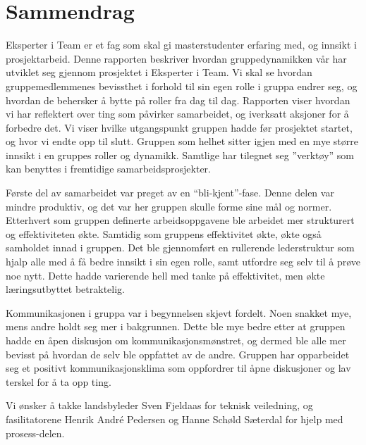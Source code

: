 \chapter*{Sammendrag}
Eksperter i Team er et fag som skal gi masterstudenter erfaring med, og innsikt i prosjektarbeid.
Denne rapporten beskriver hvordan gruppedynamikken vår har utviklet seg gjennom prosjektet i Eksperter i Team.
Vi skal se hvordan gruppemedlemmenes bevissthet i forhold til sin egen rolle i gruppa endrer seg, og hvordan de behersker å bytte på roller fra dag til dag.
Rapporten viser hvordan vi har reflektert over ting som påvirker samarbeidet, og iverksatt aksjoner for å forbedre det. 
Vi viser hvilke utgangspunkt gruppen hadde før prosjektet startet, og hvor vi endte opp til slutt. 
Gruppen som helhet sitter igjen med en mye større innsikt i en gruppes roller og dynamikk. 
Samtlige har tilegnet seg ''verktøy'' som kan benyttes i fremtidige samarbeidsprosjekter.
\vspace{\secspace}

Første del av samarbeidet var preget av en ``bli-kjent''-fase.
Denne delen var mindre produktiv, og det var her gruppen skulle forme sine mål og normer. 
Etterhvert som gruppen definerte arbeidsoppgavene ble arbeidet mer strukturert og effektiviteten økte. 
Samtidig som gruppens effektivitet økte, økte også samholdet innad i gruppen. 
Det ble gjennomført en rullerende lederstruktur som hjalp alle med å få bedre innsikt i sin egen rolle, samt utfordre seg selv til å prøve noe nytt. 
Dette hadde varierende hell med tanke på effektivitet, men økte læringsutbyttet betraktelig. 
\vspace{\secspace}

Kommunikasjonen i gruppa var i begynnelsen skjevt fordelt. 
Noen snakket mye, mens andre holdt seg mer i bakgrunnen. 
Dette ble mye bedre etter at gruppen hadde en åpen diskusjon om kommunikasjonsmønstret, og dermed ble alle mer bevisst på hvordan de selv ble oppfattet av de andre. 
Gruppen har opparbeidet seg et positivt kommunikasjonsklima som oppfordrer til åpne diskusjoner og lav terskel for å ta opp ting. 

\vfill
\begin{center}
Vi ønsker å takke landsbyleder Sven Fjeldaas for teknisk veiledning, og fasilitatorene Henrik André Pedersen og Hanne Schøld Sæterdal for hjelp med prosess-delen.
\end{center}
